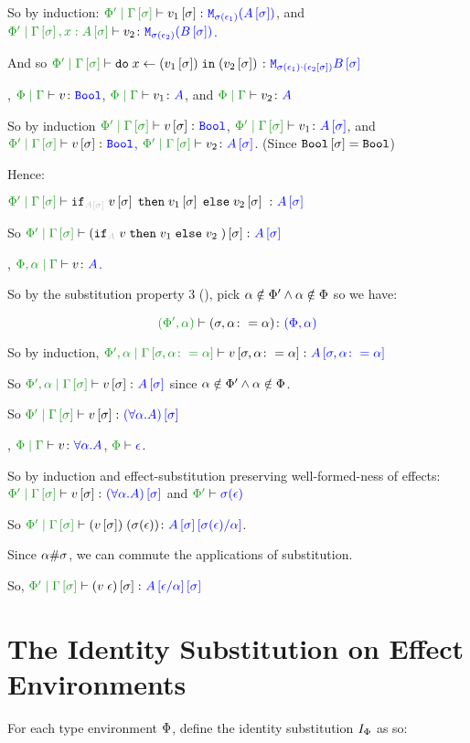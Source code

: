 {So by induction: $\etyperelation{\P'}{\G\ssi}{v_1\ssi}{\M{\si(\e_1)}{(A\ssi)}}$, and $\etyperelation{\P'}{\G\ssi, x:A\ssi}{v_2}{\M{\si(\e_2)}{(B\ssi)}}$.

And so $\etyperelation{\P'}{\G\ssi}{\doin{x}{(v_1\ssi)}{(v_2\ssi)}}{\M{\si(\e_1)\dot(\e_2\ssi)}{B\ssi}}$



\bi, $\gpetyperelation{v}{\B}$, $\gpetyperelation{v_1}{A}$, and $\gpetyperelation{v_2}{A}$

So by induction $\etyperelation{\P'}{\G\ssi}{v\ssi}{\B}$, $\etyperelation{\P'}{\G\ssi}{v_1}{A\ssi}$, and $\etyperelation{\P'}{\G\ssi}{v\ssi}{\B}$, $\etyperelation{\P'}{\G\ssi}{v_2}{A\ssi}$.
(Since $\B\ssi = \B$)

Hence:

$\etyperelation{\P'}{\G\ssi}{\pifthenelse{A\ssi}{v\ssi}{v_1\ssi}{v_2\ssi}}{A\ssi}$

So $\etyperelation{\P'}{\G\ssi}{(\pifthenelse{A}{v}{v_1}{v_2})\ssi}{A\ssi}$

\bi, $\etyperelation{\P,\a}{\G}{v}{A}$.

So by the substitution property 3 (), pick $\a\notin\P'\wedge\a\notin\P$ so we have:

$$\typerelation{(\P',\a)}{(\si, \a\setto\a)}{(\P,\a)}$$

So by induction, $\etyperelation{\P', \a}{\G\sub{\si, \a\setto\a}}{v\sub{\si,\a\setto\a}}{A\sub{\si, \a\setto\a}}$

So $\etyperelation{\P',\a}{\G\ssi}{v\ssi}{A\ssi}$ since $\a\notin\P' \wedge\a\notin\P$.

So $\etyperelation{\P'}{\G\ssi}{v\ssi}{(\all{\a}{A})\ssi}$

\bi, $\gpetyperelation{v}{\all{\a}{A}}$, $\wellformed{\P}{\e}$.

So by induction and effect-substitution preserving well-formed-ness of effects: $\etyperelation{\P'}{\G\ssi}{v\ssi}{(\all{\a}{A})\ssi}$ and $\wellformed{\P'}{\si(\e)}$

So $\etyperelation{\P'}{\G\ssi}{\eapp{(v\ssi)}{(\si(\e))}}{A\ssi\ssub{\a}{\si(\e)}}$.

Since $\a\#\si$, we can commute the applications of substitution. 

So, $\etyperelation{\P'}{\G\ssi}{(\eapp{v}{\e})\ssi}{A\ssub{\a}{\e}\ssi}$

\section{The Identity Substitution on Effect Environments}
For each type environment $\P$, define the identity substitution $I_{\P}$ as so:

}

